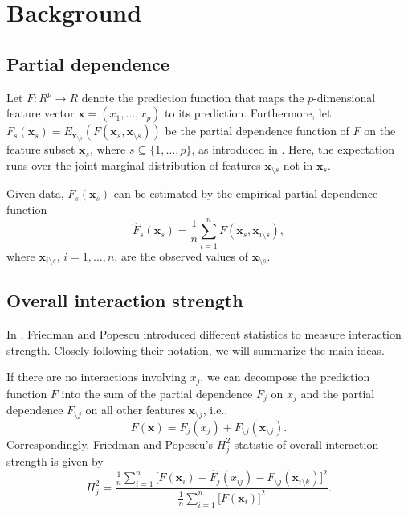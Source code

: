 \documentclass[]{article}
\title{}
\author{}
\begin{document}
\section{Background}
\subsection{Partial dependence}
Let $F: R^p \to R$ denote the prediction function that maps the $p$-dimensional feature vector $\mathbf{x} = (x_1, \dots, x_p)$ to its prediction.
Furthermore, let $F_s(\mathbf{x}_s) = E_{\mathbf{x}_{\setminus s}}(F(\mathbf{x}_s, \mathbf{x}_{\setminus s}))$ be the partial dependence function of $F$ on the feature subset $\mathbf{x}_s$, where $s \subseteq \{1, \dots, p\}$, as introduced in \cite{friedman2001}. Here, the expectation runs over the joint marginal distribution of features $\mathbf{x}_{\setminus s}$ not in $\mathbf{x}_s$.

Given data, $F_s(\mathbf{x}_s)$ can be estimated by the empirical partial dependence function
$$
  \hat F_s(\mathbf{x}_s) = \frac{1}{n} \sum_{i = 1}^n F(\mathbf{x}_s, \mathbf{x}_{i\setminus s}),
$$
where $\mathbf{x}_{i\setminus s}$, $i = 1, \dots, n$, are the observed values of $\mathbf{x}_{\setminus s}$.

\subsection{Overall interaction strength}
In \cite{friedman2008}, Friedman and Popescu introduced different statistics to measure interaction strength. Closely following their notation, we will summarize the main ideas. 

If there are no interactions involving $x_j$, we can decompose the prediction function $F$ into the sum of the partial dependence $F_j$ on $x_j$ and the partial dependence $F_{\setminus j}$ on all other features $\mathbf{x}_{\setminus j}$, i.e.,
$$
	F(\mathbf{x}) = F_j(x_j) + F_{\setminus j}(\mathbf{x}_{\setminus j}).
$$
Correspondingly, Friedman and Popescu's $H^2_j$ statistic of overall interaction strength is given by
$$
	H_{j}^2 = \frac{\frac{1}{n} \sum_{i = 1}^n\big[F(\mathbf{x}_i) - \hat F_j(x_{ij}) - \hat F_{\setminus j}(\mathbf{x}_{i\setminus k})\big]^2}{\frac{1}{n} \sum_{i = 1}^n\big[F(\mathbf{x}_i)\big]^2}.
$$
\end{document}
